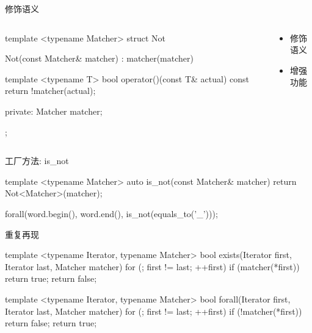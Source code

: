 \begin{frame}[fragile]{修饰语义}
\begin{columns} 
  \begin{column}{0.8\textwidth}
  \begin{c++}
  template <typename Matcher>
  struct Not {
    Not(const Matcher& matcher)
      : matcher(matcher)
    {}

    template <typename T>
    bool operator()(const T& actual) const {
      return !matcher(actual);
    }

  private:
    Matcher matcher;
  };
  \end{c++}
  \end{column}

  \begin{column}{0.2\textwidth}
  \begin{itemize}
    \item \alert{修饰语义}
    \item \alert{增强功能}
  \end{itemize}      
  \end{column}
\end{columns}   
\end{frame}

\begin{frame}[fragile]{工厂方法: is\_not}
  \begin{c++}
  template <typename Matcher>
  auto is_not(const Matcher& matcher) {
    return Not<Matcher>(matcher);
  }  

  forall(word.begin(), word.end(), is_not(equals_to('_')));
  \end{c++}
\end{frame}

\begin{frame}[fragile]{重复再现}
  \begin{c++}
  template <typename Iterator, typename Matcher>
  bool exists(Iterator first, Iterator last, Matcher matcher) {
    for (; first != last; ++first)
      if (matcher(*first))
        return true;
    return false;
  }

  template <typename Iterator, typename Matcher>
  bool forall(Iterator first, Iterator last, Matcher matcher) {
    for (; first != last; ++first)
      if (!matcher(*first))
        return false;
    return true;
  }
  \end{c++}
\end{frame}

